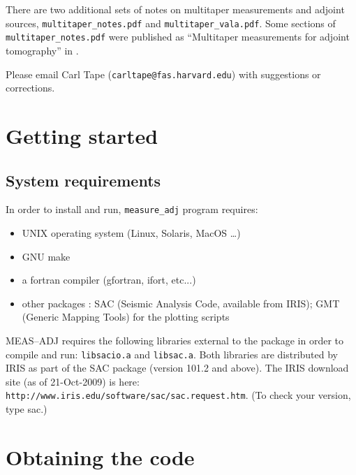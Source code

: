 \documentclass[11pt,titlepage,fleqn]{article}
\begin{document}
There are two additional sets of notes on multitaper measurements and adjoint sources, \verb+multitaper_notes.pdf+ and \verb+multitaper_vala.pdf+. Some sections of \verb+multitaper_notes.pdf+ were published as ``Multitaper measurements for adjoint tomography'' in \citet[][Appendix~C]{Tape2009phd}.

Please email Carl Tape (\verb+carltape@fas.harvard.edu+) with suggestions or corrections.


\section{Getting started}


\subsection{System requirements}

In order to install and run, \verb+measure_adj+ program requires:
%
\begin{itemize}
\item UNIX operating system (Linux, Solaris, MacOS \ldots)
\item GNU make
\item a fortran compiler (gfortran, ifort, etc...)
\item other packages : SAC (Seismic Analysis Code, available from IRIS); GMT (Generic Mapping Tools) for the plotting scripts
\end{itemize}

MEAS--ADJ requires the following libraries external to the package in order to compile and run: {\tt libsacio.a} and {\tt libsac.a}. Both libraries are distributed by IRIS as part of the SAC package (version 101.2 and above). The IRIS download site (as of 21-Oct-2009) is here: \verb+http://www.iris.edu/software/sac/sac.request.htm+. (To check your version, type sac.)


\section{Obtaining the code}

\end{document}
